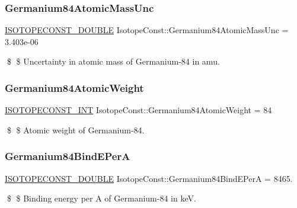 \subsubsection{\texorpdfstring{Germanium84\+Atomic\+Mass\+Unc}{Germanium84AtomicMassUnc}}
{\footnotesize\ttfamily \mbox{\hyperlink{group___isotope_const-_macros_ga8f45a7272ce02c0b4c65c44636ed719a}{I\+S\+O\+T\+O\+P\+E\+C\+O\+N\+S\+T\+\_\+\+D\+O\+U\+B\+LE}} Isotope\+Const\+::\+Germanium84\+Atomic\+Mass\+Unc = 3.\+403e-\/06}

\$ \$ Uncertainty in atomic mass of Germanium-\/84 in amu. \mbox{\label{group___isotope_const-_germanium-_ge84_ga09f2df8f14cab45f95a4f417f1f99d8a}} 
\subsubsection{\texorpdfstring{Germanium84\+Atomic\+Weight}{Germanium84AtomicWeight}}
{\footnotesize\ttfamily \mbox{\hyperlink{group___isotope_const-_macros_ga5f18360b3e99483a35c32d789e62621c}{I\+S\+O\+T\+O\+P\+E\+C\+O\+N\+S\+T\+\_\+\+I\+NT}} Isotope\+Const\+::\+Germanium84\+Atomic\+Weight = 84}

\$ \$ Atomic weight of Germanium-\/84. \mbox{\label{group___isotope_const-_germanium-_ge84_gafc1a4e1984633d7a8735079287d9e03e}} 
\subsubsection{\texorpdfstring{Germanium84\+Bind\+E\+PerA}{Germanium84BindEPerA}}
{\footnotesize\ttfamily \mbox{\hyperlink{group___isotope_const-_macros_ga8f45a7272ce02c0b4c65c44636ed719a}{I\+S\+O\+T\+O\+P\+E\+C\+O\+N\+S\+T\+\_\+\+D\+O\+U\+B\+LE}} Isotope\+Const\+::\+Germanium84\+Bind\+E\+PerA = 8465.}

\$ \$ Binding energy per A of Germanium-\/84 in keV. \mbox{\label{group___isotope_const-_germanium-_ge84_ga38dc0b97ffa443593da71b91e98a58aa}} 
